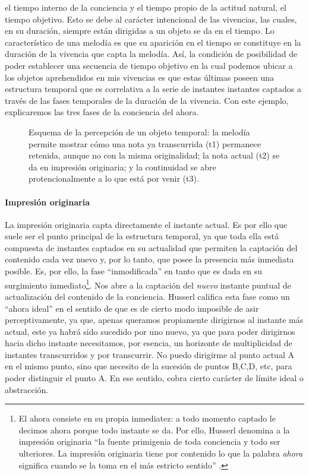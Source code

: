 el tiempo interno de la conciencia y el tiempo propio de la actitud
natural, el tiempo objetivo. Esto se debe al carácter intencional de las
vivencias, las cuales, en su duración, siempre están dirigidas a un
objeto se da en el tiempo. Lo característico de una melodía es que su
aparición en el tiempo se constituye en la duración de la vivencia que
capta la melodía. Así, la condición de posibilidad de poder establecer
una secuencia de tiempo objetivo en la cual podemos ubicar a los objetos
aprehendidos en mis vivencias es que estas últimas poseen una estructura
temporal que es correlativa a la serie de instantes instantes captados a
través de las fases temporales de la duración de la vivencia. Con este
ejemplo, explicaremos las tres fases de la conciencia del ahora.


\begin{figure}[htbp]
    \centering
    
    \caption{Esquema de la percepción de un objeto temporal: la melodía permite mostrar cómo una nota ya transcurrida (t1) permanece retenida, aunque no con la misma originalidad; la nota actual (t2) se da en impresión originaria; y la continuidad se abre protencionalmente a lo que está por venir (t3).}
    \label{fig:objeto-temporal}
\end{figure}

\paragraph{Impresión originaria}

La impresión originaria capta directamente el instante actual. Es por
ello que suele ser el punto principal de la estructura temporal, ya que
toda ella está compuesta de instantes captados en su actualidad que
permiten la captación del contenido cada vez nuevo y, por lo tanto, que
posee la presencia más inmediata posible. Es, por ello, la fase
``inmodificada'' en tanto que es dada en su surgimiento
inmediato\footnote{El ahora consiste en su propia inmediatez: a todo
  momento captado le decimos ahora porque todo instante se da. Por ello,
  Husserl denomina a la impresión originaria ``la fuente primigenia de
  toda conciencia y todo ser ulteriores. La impresión originaria tiene
  por contenido lo que la palabra \emph{ahora} significa cuando se la
  toma en el más estricto sentido'' \cite[§31, p.~87]{husserl2002}.}. Nos abre
a la captación del \emph{nuevo} instante puntual de actualización del
contenido de la conciencia. Husserl califica esta fase como un ``ahora
ideal'' en el sentido de que es de cierto modo imposible de asir
perceptivamente, ya que, apenas queramos propiamente dirigirnos al
instante más actual, este ya habrá sido sucedido por uno nuevo, ya que
para poder dirigirnos hacia dicho instante necesitamos, por esencia, un
horizonte de multiplicidad de instantes transcurridos y por transcurrir.
No puedo dirigirme al punto actual A en el mismo punto, sino que
necesito de la sucesión de puntos B,C,D, etc, para poder distinguir el
punto A. En ese sentido, cobra cierto carácter de límite ideal o
abstracción.

